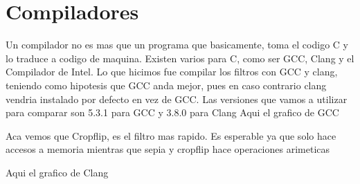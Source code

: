 \section{Compiladores}
Un compilador no es mas que un programa que basicamente, toma el codigo C 
y lo traduce a codigo de maquina. Existen varios para C, como ser GCC, Clang y el Compilador de Intel. 
Lo que hicimos fue compilar los filtros con GCC y clang, teniendo como hipotesis que GCC anda mejor, pues en caso contrario clang vendria instalado por defecto en vez de GCC.
Las versiones que vamos a utilizar para comparar son 5.3.1 para GCC y 3.8.0 para Clang
Aqui el grafico de GCC

\begin{figure}[H]
    \centering
    \begin{floatrow}
    \end{floatrow}
\end{figure}


Aca vemos que Cropflip, es el filtro mas rapido. Es esperable ya que solo hace accesos a memoria mientras que sepia y cropflip hace operaciones arimeticas

Aqui el grafico de Clang

